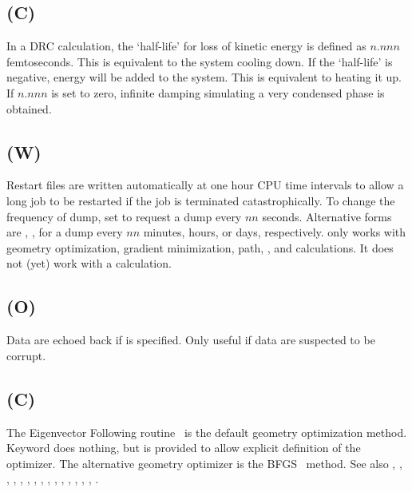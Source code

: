 \subsection*{ (C)}
In a DRC calculation, the `half-life' for loss of kinetic energy  is
defined as $n.nnn$ femtoseconds.  This is equivalent to the system cooling down.
If the `half-life' is negative, energy will be added to the system.  This is
equivalent to heating it up.  If $n.nnn$ is set to zero, infinite damping
simulating a very condensed phase is obtained.


\subsection*{ (W)}
Restart files  are  written  automatically  at  one  hour  CPU  time intervals
to  allow  a long job to be restarted if the job is terminated
catastrophically.  To change  the  frequency  of  dump,  set  
to request  a dump every $nn$ seconds.  Alternative forms are
, ,  for a dump every $nn$
minutes, hours,  or days, respectively.   only  works  with geometry
optimization, gradient minimization,  path, , and 
calculations.  It does not (yet) work with a  calculation.


\subsection*{ (O)}
Data are echoed back if  is specified.  Only useful if data  are
suspected to be corrupt.

\subsection*{ (C)}
The Eigenvector Following routine~\cite{ef-ts} is the default geometry
optimization method.  Keyword  does nothing, but is provided to allow
explicit definition of the optimizer.  The alternative geometry optimizer is
the  BFGS~\cite{bfgs1,bfgs2,bfgs3,bfgs4} method. See also  ,
, ,  , ,  ,
, , , , , ,
, , , .

